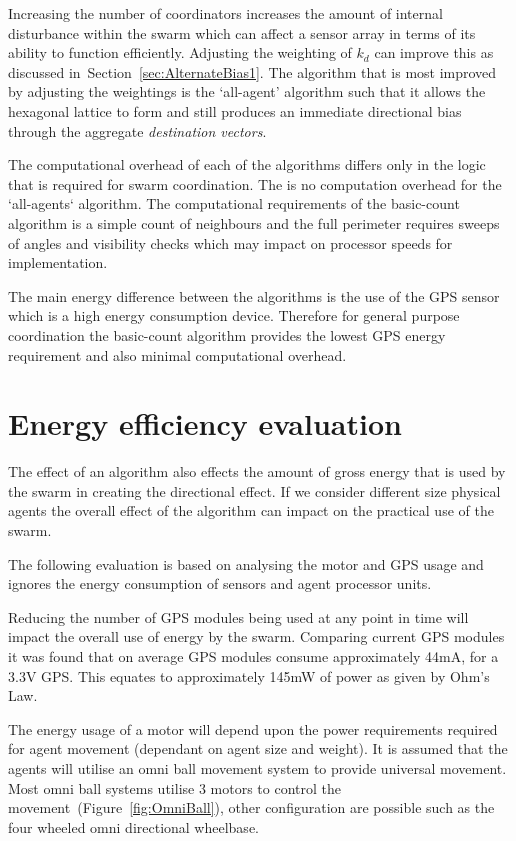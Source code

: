 \documentclass{ieeeaccess}
\begin{document}
Increasing the number of coordinators increases the amount of internal disturbance within the swarm which can affect a sensor array in terms of its ability to function efficiently. Adjusting the weighting of $k_d$ can improve this as discussed in~Section~\ref{sec:AlternateBias1}. The algorithm that is most improved by adjusting the weightings is the `all-agent' algorithm such that it allows the hexagonal lattice to form and still produces an immediate directional bias through the aggregate \textit{destination vectors}.  

The computational overhead of each of the algorithms differs only in the logic that is required for swarm coordination. The is no computation overhead for the `all-agents` algorithm. The computational requirements of the basic-count algorithm is a simple count of neighbours and the full perimeter requires sweeps of angles and visibility checks which may impact on processor speeds for implementation. 

The main energy difference between the algorithms is the use of the GPS sensor which is a high energy consumption device. Therefore for general purpose coordination the basic-count algorithm provides the lowest GPS energy requirement and also minimal computational overhead.

\section{Energy efficiency evaluation}\label{reduced:EnergyReductionGPS}
The effect of an algorithm also effects the amount of gross energy that is used by the swarm in creating the directional effect. If we consider different size physical agents the overall effect of the algorithm can impact on the practical use of the swarm.

The following evaluation is based on analysing the motor and GPS usage and ignores the energy consumption of sensors and agent processor units.

Reducing the number of GPS modules being used at any point in time will impact the overall use of energy by the swarm. Comparing current GPS modules it was found that on average GPS modules consume approximately 44mA, for a 3.3V GPS. This equates to approximately 145mW of power as given by Ohm's Law. 


The energy usage of a motor will depend upon the power requirements required for agent movement (dependant on agent size and weight). It is assumed that the agents will utilise an omni ball movement system to provide universal movement. Most omni ball systems utilise 3 motors to control the movement~(Figure~\ref{fig:OmniBall}), other configuration are possible such as the four wheeled omni directional wheelbase\cite{PD:06}.
\end{document}
